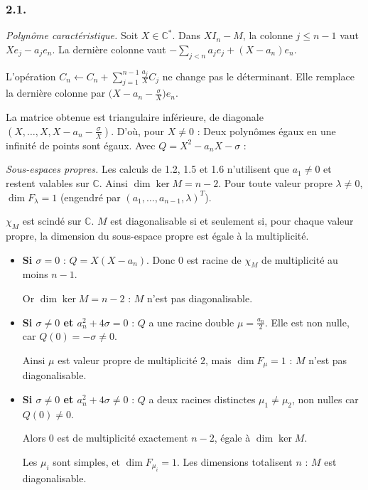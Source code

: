 \documentclass[11pt,a4paper]{article}
\newcommand{\equationajustee}[1]{%
  \sbox{\boiteequation}{$\displaystyle #1$}%
  \ifdim\wd\boiteequation>\linewidth
    \[\resizebox{\linewidth}{!}{\usebox{\boiteequation}}\]%
  \else
    \[#1\]%
  \fi}
\begin{document}
\hypertarget{section-38}{%
\subsubsection{2.1.}\label{section-38}}

\emph{Polynôme caractéristique.} Soit \(X\in\mathbb C^*\). Dans \(XI_n-M\), la colonne \(j\le n-1\) vaut \(Xe_j-a_je_n\). La dernière colonne vaut \(-\sum_{j<n}a_je_j+(X-a_n)e_n\).

L'opération \(C_n\leftarrow C_n+\sum_{j=1}^{n-1}\frac{a_j}XC_j\) ne change pas le déterminant. Elle remplace la dernière colonne par \(\big(X-a_n-\frac\sigma X\big)e_n\).

La matrice obtenue est triangulaire inférieure, de diagonale \((X,\dots,X,X-a_n-\frac\sigma X)\). D'où, pour \(X\neq0\) :
\equationajustee{\begin{aligned}
\chi_M(X)&=X^{n-1}\Big(X-a_n-\frac\sigma X\Big)\\
&=X^{n-2}\big(X^2-a_nX-\sigma\big).
\end{aligned}}
Deux polynômes égaux en une infinité de points sont égaux. Avec \(Q=X^2-a_nX-\sigma\) :
\equationajustee{\boxed{\chi_M=X^{n-2}Q.}}

\emph{Sous-espaces propres.} Les calculs de 1.2, 1.5 et 1.6 n'utilisent que \(a_1\ne0\) et restent valables sur \(\mathbb C\). Ainsi \(\dim\ker M=n-2\). Pour toute valeur propre \(\lambda\ne0\), \(\dim F_\lambda=1\) (engendré par \((a_1,\dots,a_{n-1},\lambda)^T\)).

\(\chi_M\) est scindé sur \(\mathbb C\). \(M\) est diagonalisable si et seulement si, pour chaque valeur propre, la dimension du sous-espace propre est égale à la multiplicité.

\begin{itemize}
\item
  \textbf{Si \(\sigma=0\)} : \(Q=X(X-a_n)\). Donc \(0\) est racine de \(\chi_M\) de multiplicité au moins \(n-1\).

  Or \(\dim\ker M=n-2\) : \(M\) n'est pas diagonalisable.
\item
  \textbf{Si \(\sigma\ne0\) et \(a_n^2+4\sigma=0\)} : \(Q\) a une racine double \(\mu=\frac{a_n}2\). Elle est non nulle, car \(Q(0)=-\sigma\ne0\).

  Ainsi \(\mu\) est valeur propre de multiplicité \(2\), mais \(\dim F_\mu=1\) : \(M\) n'est pas diagonalisable.
\item
  \textbf{Si \(\sigma\ne0\) et \(a_n^2+4\sigma\ne0\)} : \(Q\) a deux racines distinctes \(\mu_1\neq\mu_2\), non nulles car \(Q(0)\neq0\).

  Alors \(0\) est de multiplicité exactement \(n-2\), égale à \(\dim\ker M\).

  Les \(\mu_i\) sont simples, et \(\dim F_{\mu_i}=1\). Les dimensions totalisent \(n\) : \(M\) est diagonalisable.
\end{itemize}
\end{document}
